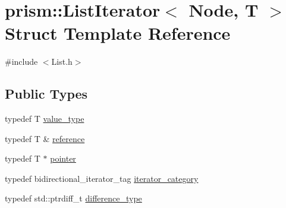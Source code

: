 \hypertarget{structprism_1_1_list_iterator}{}\section{prism\+:\+:List\+Iterator$<$ Node, T $>$ Struct Template Reference}
\label{structprism_1_1_list_iterator}


{\ttfamily \#include $<$List.\+h$>$}

\subsection*{Public Types}
\begin{DoxyCompactItemize}
\item 
typedef T \hyperlink{structprism_1_1_list_iterator_a9df2822c03b49086c3ddf55ac4816321}{value\+\_\+type}
\item 
typedef T \& \hyperlink{structprism_1_1_list_iterator_a8102dfe3c26bb09d44c54ce276debf69}{reference}
\item 
typedef T $\ast$ \hyperlink{structprism_1_1_list_iterator_a7df7f6f08916f0bbe2e0b0ce675e0cee}{pointer}
\item 
typedef bidirectional\+\_\+iterator\+\_\+tag \hyperlink{structprism_1_1_list_iterator_a3accec188667cc3b84dca49151b83b95}{iterator\+\_\+category}
\item 
typedef std\+::ptrdiff\+\_\+t \hyperlink{structprism_1_1_list_iterator_a1353d7adf61676d3913acaa1b00fed94}{difference\+\_\+type}
\end{DoxyCompactItemize}
